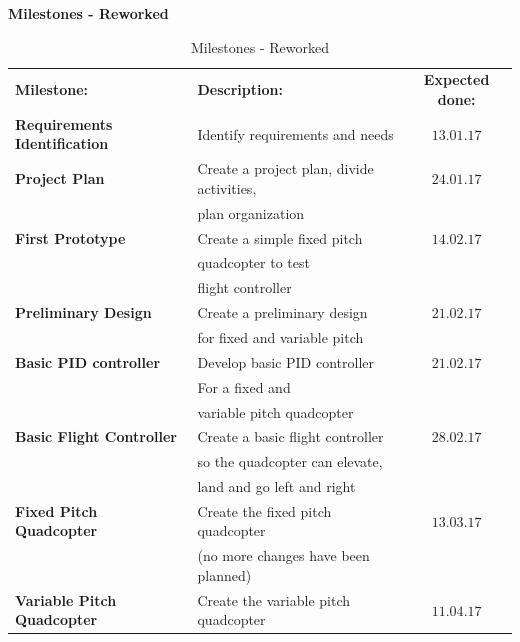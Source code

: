 \begin{table}[H]
\begin{center}
\textbf{\Large Milestones - Reworked}
\end{center}
\caption{Milestones - Reworked}
\label{tab:milestonesreworked}
\begin{tabular}{llc}
\rowcolor{cadetgrey}
\centering \textbf{Milestone:}    &\textbf{Description:} 	 &\textbf{Expected done:} \\ %

\rowcolor{gainsboro}
\textbf{Requirements Identification} & Identify requirements and needs & $13.01.17$ \\
\textbf{Project Plan} & Create a project plan, divide activities, & $24.01.17$ \\
                                     & plan organization & \\
\rowcolor{gainsboro}
\textbf{First Prototype} & Create a simple fixed pitch & $14.02.17$ \\\rowcolor{gainsboro}
                         & quadcopter to test & \\\rowcolor{gainsboro}
                         & flight controller & \\
\textbf{Preliminary Design} & Create a preliminary design & $21.02.17$ \\
                            & for fixed and variable pitch & \\\rowcolor{gainsboro}
\textbf{Basic PID controller} & Develop basic PID controller & $21.02.17$ \\\rowcolor{gainsboro}
                                 & For a fixed and & \\\rowcolor{gainsboro}
                                 & variable pitch quadcopter & \\
\textbf{Basic Flight Controller} & Create a basic flight controller & $28.02.17$ \\
                                 & so the quadcopter can elevate, & \\
                                 & land and go left and right & \\\rowcolor{gainsboro}
\textbf{Fixed Pitch Quadcopter} & Create the fixed pitch quadcopter & $13.03.17$ \\\rowcolor{gainsboro}
                                & (no more changes have been planned) & \\
\textbf{Variable Pitch Quadcopter}  & Create the variable pitch quadcopter & $11.04.17$ \\

\end{tabular}
\end{table}
